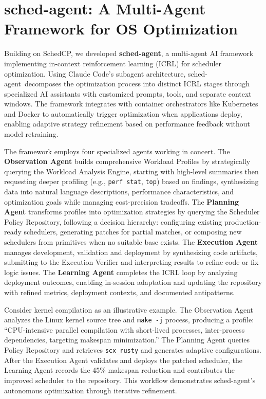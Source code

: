 \documentclass[preprint]{article}
\newcommand{\sys}{SchedCP\xspace}
\newcommand{\agent}{sched-agent\xspace}
\begin{document}
\section{\agent: A Multi-Agent Framework for OS Optimization}
\label{sec:sched_agents}

Building on \sys, we developed \textbf{\agent}, a multi-agent AI framework implementing in-context reinforcement learning (ICRL)\cite{incontextrl} for scheduler optimization. Using Claude Code's subagent architecture\cite{anthropic2024subagents}, \agent\ decomposes the optimization process into distinct ICRL stages through specialized AI assistants with customized prompts, tools, and separate context windows\cite{anthropic2024multiagent}. The framework integrates with container orchestrators like Kubernetes and Docker to automatically trigger optimization when applications deploy, enabling adaptive strategy refinement based on performance feedback without model retraining.

The framework employs four specialized agents working in concert. The \textbf{Observation Agent} builds comprehensive Workload Profiles by strategically querying the Workload Analysis Engine, starting with high-level summaries then requesting deeper profiling (e.g., \texttt{perf stat}, \texttt{top}) based on findings, synthesizing data into natural language descriptions, performance characteristics, and optimization goals while managing cost-precision tradeoffs. The \textbf{Planning Agent} transforms profiles into optimization strategies by querying the Scheduler Policy Repository, following a decision hierarchy: configuring existing production-ready schedulers, generating patches for partial matches, or composing new schedulers from primitives when no suitable base exists. The \textbf{Execution Agent} manages development, validation and deployment by synthesizing code artifacts, submitting to the Execution Verifier and interpreting results to refine code or fix logic issues. The \textbf{Learning Agent} completes the ICRL loop by analyzing deployment outcomes, enabling in-session adaptation and updating the repository with refined metrics, deployment contexts, and documented antipatterns.

Consider kernel compilation as an illustrative example. The Observation Agent analyzes the Linux kernel source tree and \texttt{make -j} process, producing a profile: ``CPU-intensive parallel compilation with short-lived processes, inter-process dependencies, targeting makespan minimization.'' The Planning Agent queries Policy Repository and retrieves \texttt{scx\_rusty} and generates adaptive configurations. After the Execution Agent validates and deploys the patched scheduler, the Learning Agent records the 45\% makespan reduction and contributes the improved scheduler to the repository. This workflow demonstrates \agent's autonomous optimization through iterative refinement.
\end{document}
